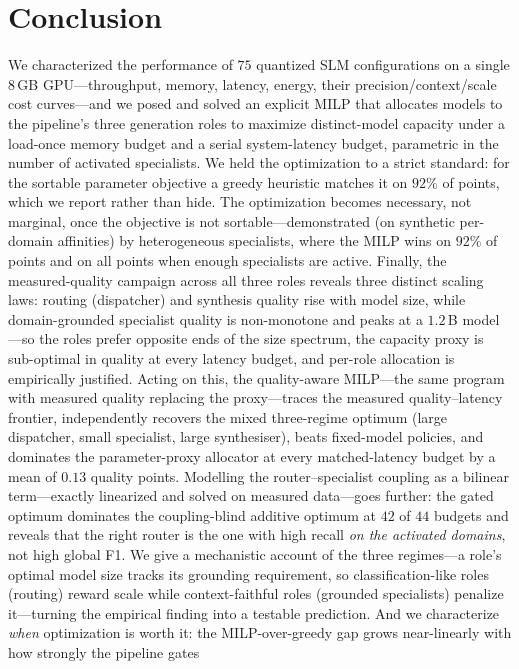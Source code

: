 \documentclass[11pt]{article}
\begin{document}
\section{Conclusion}
We characterized the performance of $75$ quantized SLM configurations on a single
$8$\,GB GPU---throughput, memory, latency, energy, their precision/context/scale
cost curves---and
we posed and solved an explicit MILP that allocates models to the pipeline's
three generation roles to maximize distinct-model capacity under a load-once
memory budget and a serial system-latency budget, parametric in the number of
activated specialists. We held the optimization to a strict standard: for the
sortable parameter objective a greedy heuristic matches it on $92\%$ of points,
which we report rather than hide. The optimization becomes necessary, not
marginal, once the objective is not sortable---demonstrated (on synthetic
per-domain affinities) by heterogeneous specialists, where the MILP wins on $92\%$
of points and on all points when enough specialists are active. Finally, the
measured-quality campaign across all three roles reveals three distinct scaling
laws: routing (dispatcher) and synthesis quality rise with model size, while
domain-grounded specialist quality is non-monotone and peaks at a $1.2$\,B
model---so the roles prefer opposite ends of the size spectrum, the capacity
proxy is sub-optimal in quality at every latency budget, and per-role allocation
is empirically justified. Acting on this, the quality-aware MILP---the same
program with measured quality replacing the proxy---traces the measured
quality--latency frontier, independently recovers the mixed three-regime optimum
(large dispatcher, small specialist, large synthesiser), beats fixed-model
policies, and dominates the parameter-proxy allocator at every matched-latency
budget by a mean of $0.13$ quality points. Modelling the router--specialist
coupling as a bilinear term---exactly linearized and solved on measured data---goes
further: the gated optimum dominates the coupling-blind additive optimum at $42$ of
$44$ budgets and reveals that the right router is the one with high recall \emph{on
the activated domains}, not high global F1. We give a mechanistic account of the
three regimes---a role's optimal model size tracks its grounding requirement, so
classification-like roles (routing) reward scale while context-faithful roles
(grounded specialists) penalize it---turning the empirical finding into a testable
prediction. And we characterize \emph{when} optimization is worth it: the
MILP-over-greedy gap grows near-linearly with how strongly the pipeline gates
\end{document}
